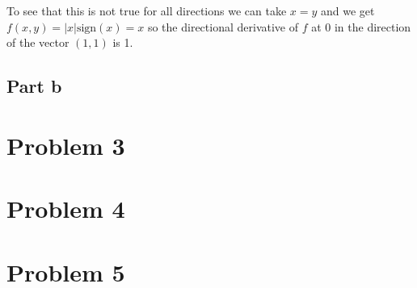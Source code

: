 \documentclass{article}
\begin{document}
To see that this is not true for all directions we can take $x=y$ and we get
$f(x,y)=|x|\text{sign}(x)=x$ so the directional derivative of $f$ at 0 in the
direction of the vector $(1,1)$ is 1.
\subsection{Part b}
\section{Problem 3}
\section{Problem 4}
\section{Problem 5}
\end{document}
